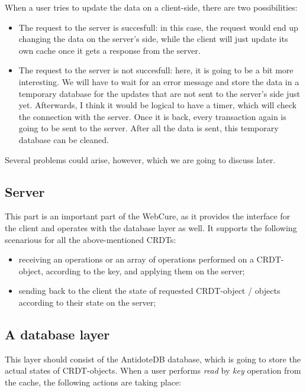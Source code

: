  When a user tries to update the data on a client-side, there are two possibilities:
  
  \begin{itemize}
    \item{The request to the server is succesfull: in this case, the request would end up changing the data on the server's side, while the client will just update its own cache once it gets a response from the server.}
    \item{The request to the server is not succesfull: here, it is going to be a bit more interesting. We will have to wait for an error message and store the data in a temporary database for the updates that are not sent to the server's side just yet. Afterwards, I think it would be logical to have a timer, which will check the connection with the server. Once it is back, every transaction again is going to be sent to the server. After all the data is sent, this temporary database can be cleaned. }
\end{itemize}
    
    Several problems could arise, however, which we are going to discuss later.

\subsection{Server}

This part is an important part of the WebCure, as it provides the interface for the client and operates with the database layer as well. It supports the following scenarious for all the above-mentioned CRDTs:

\begin{itemize}
    \item receiving an operations or an array of operations performed on a CRDT-object, according to the key, and applying them on the server;
    \item sending back to the client the state of requested CRDT-object / objects according to their state on the server;
\end{itemize}

\subsection{A database layer}

This layer should consist of the AntidoteDB database, which is going to store the actual states of CRDT-objects. When a user performs \textit{read} by \textit{key} operation from the cache, the following actions are taking place:

